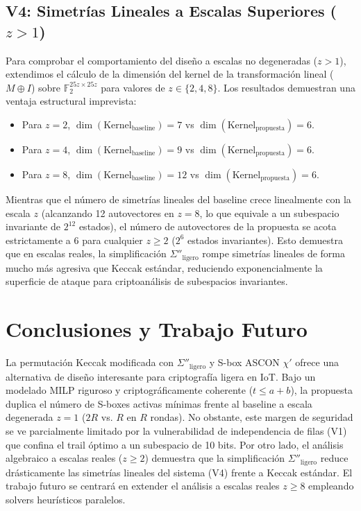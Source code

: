 \documentclass[journal,compsoc]{IEEEtran}
\begin{document}
\subsection{V4: Simetrías Lineales a Escalas Superiores ($z > 1$)}
Para comprobar el comportamiento del diseño a escalas no degeneradas ($z > 1$), extendimos el cálculo de la dimensión del kernel de la transformación lineal ($M \oplus I$) sobre $\mathbb{F}_2^{25z \times 25z}$ para valores de $z \in \{2, 4, 8\}$. Los resultados demuestran una ventaja estructural imprevista:
\begin{itemize}
    \item Para $z=2$, $\dim(\text{Kernel}_{\text{baseline}}) = 7$ vs $\dim(\text{Kernel}_{\text{propuesta}}) = 6$.
    \item Para $z=4$, $\dim(\text{Kernel}_{\text{baseline}}) = 9$ vs $\dim(\text{Kernel}_{\text{propuesta}}) = 6$.
    \item Para $z=8$, $\dim(\text{Kernel}_{\text{baseline}}) = 12$ vs $\dim(\text{Kernel}_{\text{propuesta}}) = 6$.
\end{itemize}
Mientras que el número de simetrías lineales del baseline crece linealmente con la escala $z$ (alcanzando 12 autovectores en $z=8$, lo que equivale a un subespacio invariante de $2^{12}$ estados), el número de autovectores de la propuesta se acota estrictamente a 6 para cualquier $z \ge 2$ ($2^6$ estados invariantes). Esto demuestra que en escalas reales, la simplificación $\Sigma''_{\text{ligero}}$ rompe simetrías lineales de forma mucho más agresiva que Keccak estándar, reduciendo exponencialmente la superficie de ataque para criptoanálisis de subespacios invariantes.

\section{Conclusiones y Trabajo Futuro}
La permutación Keccak modificada con $\Sigma''_{\text{ligero}}$ y S-box ASCON $\chi'$ ofrece una alternativa de diseño interesante para criptografía ligera en IoT. Bajo un modelado MILP riguroso y criptográficamente coherente ($t \le a+b$), la propuesta duplica el número de S-boxes activas mínimas frente al baseline a escala degenerada $z=1$ ($2R$ vs. $R$ en $R$ rondas). No obstante, este margen de seguridad se ve parcialmente limitado por la vulnerabilidad de independencia de filas (V1) que confina el trail óptimo a un subespacio de 10 bits. Por otro lado, el análisis algebraico a escalas reales ($z \ge 2$) demuestra que la simplificación $\Sigma''_{\text{ligero}}$ reduce drásticamente las simetrías lineales del sistema (V4) frente a Keccak estándar. El trabajo futuro se centrará en extender el análisis a escalas reales $z \ge 8$ empleando solvers heurísticos paralelos.
\end{document}

